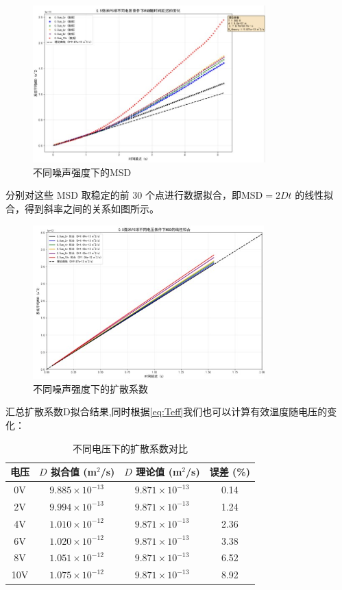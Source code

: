\documentclass[a4paper]{report} %
\begin{document}
\begin{figure}[H]
    \centering
    \includegraphics[width=0.8\textwidth]{不同噪声强度下的MSD.jpg}
    \caption{不同噪声强度下的MSD}
    \label{fig:msdnoise}
\end{figure}
分别对这些 MSD 取稳定的前 30 个点进行数据拟合，即$\text{MSD} = 2Dt$
的线性拟合，得到斜率之间的关系如图所示。
\begin{figure}[H]
    \centering
    \includegraphics[width=0.8\textwidth]{不同噪声强度下的扩散系数.jpg}
    \caption{不同噪声强度下的扩散系数}
    \label{fig:diffusionnoise}
\end{figure}
汇总扩散系数D拟合结果,同时根据\eqref{eq:Teff}我们也可以计算有效温度随电压的变化：
\begin{table}[H]
    \centering
    \caption{不同电压下的扩散系数对比}
    \begin{tabular}{cccc}
        \toprule
        电压 & $D$ 拟合值 (m$^2$/s) & $D$ 理论值 (m$^2$/s) & 误差 (\%) \\
        \midrule
        0V  & $9.885 \times 10^{-13}$ & $9.871 \times 10^{-13}$ & 0.14 \\
        2V  & $9.994 \times 10^{-13}$ & $9.871 \times 10^{-13}$ & 1.24 \\
        4V  & $1.010 \times 10^{-12}$ & $9.871 \times 10^{-13}$ & 2.36 \\
        6V  & $1.020 \times 10^{-12}$ & $9.871 \times 10^{-13}$ & 3.38 \\
        8V  & $1.051 \times 10^{-12}$ & $9.871 \times 10^{-13}$ & 6.52 \\
        10V & $1.075 \times 10^{-12}$ & $9.871 \times 10^{-13}$ & 8.92 \\
        \bottomrule
    \end{tabular}
\end{table}
\end{document}
